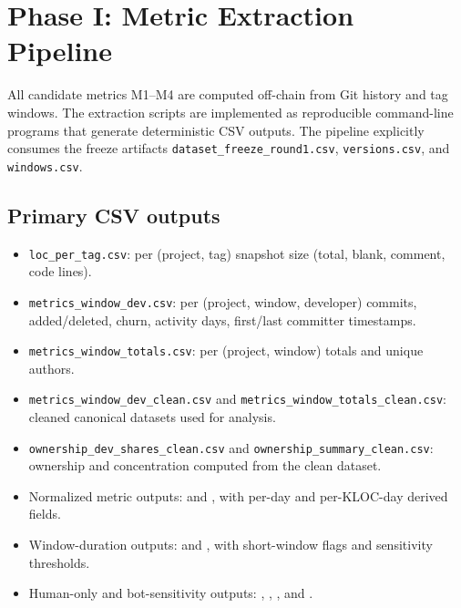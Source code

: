 \section{Phase I: Metric Extraction Pipeline}
\label{sec:phase1_pipeline}

All candidate metrics M1--M4 are computed off-chain from Git history and tag windows.
The extraction scripts are implemented as reproducible command-line programs that generate deterministic CSV outputs.
The pipeline explicitly consumes the freeze artifacts \texttt{dataset\_freeze\_round1.csv}, \texttt{versions.csv}, and \texttt{windows.csv}.

\subsection{Primary CSV outputs}
\label{sec:phase1_outputs}

\begin{itemize}[leftmargin=*]
  \item \texttt{loc\_per\_tag.csv}: per (project, tag) snapshot size (total, blank, comment, code lines).
  \item \texttt{metrics\_window\_dev.csv}: per (project, window, developer) commits, added/deleted, churn, activity days, first/last committer timestamps.
  \item \texttt{metrics\_window\_totals.csv}: per (project, window) totals and unique authors.
  \item \texttt{metrics\_window\_dev\_clean.csv} and \texttt{metrics\_window\_totals\_clean.csv}: cleaned canonical datasets used for analysis.
  \item \texttt{ownership\_dev\_shares\_clean.csv} and \texttt{ownership\_summary\_clean.csv}: ownership and concentration computed from the clean dataset.
  \item Normalized metric outputs:  and , with per-day and per-KLOC-day derived fields.
  \item Window-duration outputs:  and , with short-window flags and sensitivity thresholds.
  \item Human-only and bot-sensitivity outputs: , , , and .
\end{itemize}

